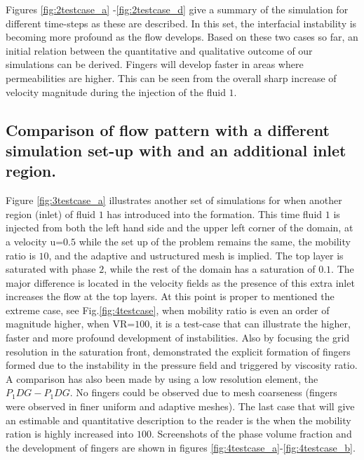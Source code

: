 \documentclass[preprint,authoryear,12pt]{elsarticle}
\begin{document}
\medskip
Figures \ref{fig:2testcase_a}%
-\ref{fig:2testcase_d} give a summary of the simulation for different time-steps as these are described. In this set, the interfacial instability is becoming more profound as the flow develops. Based on these two cases so far, an initial relation between the quantitative and qualitative outcome of our simulations can be derived. Fingers will develop faster in areas where permeabilities are higher. This can be seen from the overall sharp increase of velocity magnitude during the injection of the fluid $1$.        
  


\subsection{Comparison of flow pattern with a different simulation set-up with and an additional inlet region.}\label{section:results_dinlet}

\medskip
Figure \ref{fig:3testcase_a} illustrates another set of simulations for when another region (inlet) of fluid $1$ has introduced into the formation. This time fluid $1$ is injected from both the left hand side and the upper left corner of the domain, at a velocity u=$0.5$ while the set up of the problem remains the same, the mobility ratio is $10$, and the adaptive and ustructured mesh is implied. The top layer is saturated with phase $2$, while the rest of the domain has a saturation of $0.1$. The major difference is located in the velocity fields %
as the presence of this extra inlet increases the flow at the top layers. At this point is proper to mentioned the extreme case, see Fig.\ref{fig:4testcase}, when mobility ratio is even an order of magnitude higher, when VR=$100$, 
it is a test-case that can illustrate the higher, faster and more profound development of instabilities. Also by focusing the grid resolution in the saturation front, \citet{christou_2015}  demonstrated the explicit formation of fingers formed due to the instability in the pressure ﬁeld and triggered by viscosity ratio. A comparison has also been made by using a low resolution element, the $P_{1}DG-P_{1}DG$. No fingers could be observed due to mesh coarseness (fingers were observed in ﬁner uniform and adaptive meshes). The last case that will give an estimable and quantitative description to the reader is the when the mobility ration is highly increased into $100$. Screenshots of the phase volume fraction and the development of fingers are shown in figures \ref{fig:4testcase_a}-\ref{fig:4testcase_b}.
\end{document}
